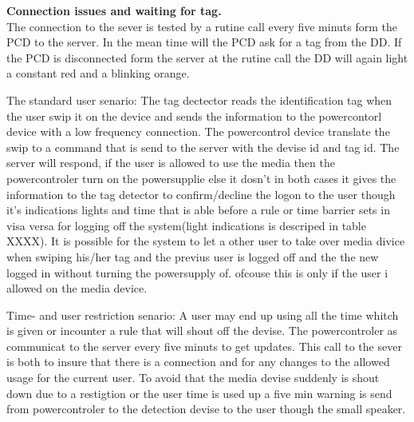 \textbf{Connection issues and waiting for tag.} \\
The connection to the sever is tested by a rutine call every five minuts form the PCD to the server. In the mean time will the PCD ask for a tag from the DD. If the PCD is disconnected form the server at the rutine call the DD will again light a constant red and a blinking orange.    
  


The standard user senario:
The tag dectector reads the identification tag when the user swip it on the device and sends the information to the powercontorl device with a low frequency connection.
The powercontrol device translate the swip to a command that is send to the server with the devise id and tag id. The server will respond, if the user is allowed to use the media then the powercontroler turn on the powersupplie else it dosn't in both cases it gives the information to the tag detector to confirm/decline the logon to the user though it's indications lights and time that is able before a rule or time barrier sets in visa versa for logging off the system(light indications is descriped in table XXXX). It is possible for the system to let a other user to take over media divice when swiping his/her tag and the previus user is logged off and the the new logged in without turning the powersupply of. ofcouse this is only if the user i allowed on the media device. 

Time- and user restriction senario:
A user may end up using all the time whitch is given or incounter a rule that will shout off the devise. The powercontroler as communicat to the server every five minuts to get updates. This call to the sever is both to insure that there is a connection and for any changes to the allowed usage for the current user. To avoid that the media devise suddenly is shout down due to a restigtion or the user time is used up a five min warning is send from powercontroler to the detection devise to the user though the small speaker. 

